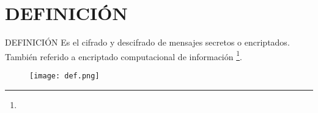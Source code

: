 \section{DEFINICIÓN}
\begin{frame}{DEFINICIÓN}
	Es el cifrado y descifrado de mensajes  secretos o encriptados. También referido a encriptado computacional de información \vspace{-0.8cm}\footnote{}.  \vspace{1cm}
    \begin{figure}[H]
    	\centering
        \texttt{[image: def.png]}
    \end{figure}
\end{frame}